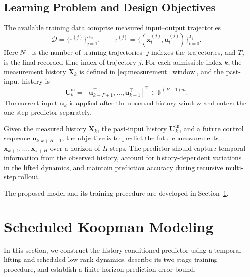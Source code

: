 \documentclass[journal]{IEEEtran}
\newcommand{\vx}{\mathbf{x}}
\newcommand{\vu}{\mathbf{u}}
\newcommand{\mU}{\mathbf{U}}
\newcommand{\mX}{\mathbf{X}}
\begin{document}
\subsection{Learning Problem and Design Objectives}
\label{sec:problem}

The available training data comprise measured input--output trajectories
\begin{equation}
    \mathcal{D}=\{\tau^{(j)}\}_{j=1}^{N_{\mathrm{tr}}},\qquad
    \tau^{(j)}=\{(\vx_t^{(j)},\vu_t^{(j)})\}_{t=0}^{T_j}.
    \label{eq:trajectory_dataset}
\end{equation}
Here $N_{\mathrm{tr}}$ is the number of training trajectories, $j$ indexes the trajectories, and $T_j$ is the final recorded time index of trajectory $j$. For each admissible index $k$, the measurement history $\mX_k$ is defined in \eqref{eq:measurement_window}, and the past-input history is
\begin{equation}
    \mU_k^{\mathrm{in}}=[\vu_{k-P+1}^\top,\ldots,\vu_{k-1}^\top]^\top
    \in\mathbb R^{(P-1)m}.
    \label{eq:history_windows}
\end{equation}
The current input $\vu_k$ is applied after the observed history window and enters the one-step predictor separately.

Given the measured history $\mX_k$, the past-input history $\mU_k^{\mathrm{in}}$, and a future control sequence $\vu_{k:k+H-1}$, the objective is to predict the future measurements $\vx_{k+1},\ldots,\vx_{k+H}$ over a horizon of $H$ steps. The predictor should capture temporal information from the observed history, account for history-dependent variations in the lifted dynamics, and maintain prediction accuracy during recursive multi-step rollout.

The proposed model and its training procedure are developed in Section~\ref{sec:model}.


\section{Scheduled Koopman Modeling}
\label{sec:model}

In this section, we construct the history-conditioned predictor using a temporal lifting and scheduled low-rank dynamics, describe its two-stage training procedure, and establish a finite-horizon prediction-error bound.
\end{document}
